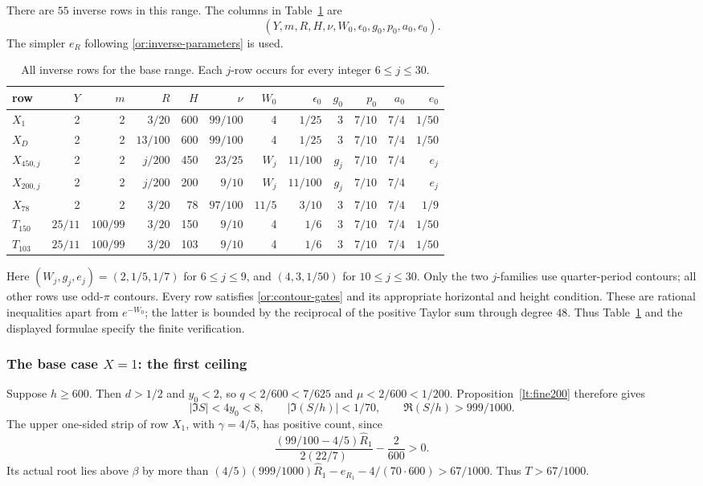 There are $55$ inverse rows in this range.  The columns in
Table~\ref{or:base-contours} are
\[
 (Y,m,R,H,\nu,W_0,\epsilon_0,g_0,p_0,a_0,e_0).
\]
The simpler $e_R$ following \eqref{or:inverse-parameters} is used.
\begin{table}[ht]
\centering\scriptsize
\caption{All inverse rows for the base range.  Each $j$-row occurs for
every integer $6\le j\le30$.}\label{or:base-contours}
\begin{tabular}{@{}lrrrrrrrrrrr@{}}
\toprule
row&$Y$&$m$&$R$&$H$&$\nu$&$W_0$&$\epsilon_0$&$g_0$&$p_0$&$a_0$&$e_0$\\
\midrule
$X_1$&2&2&$3/20$&600&$99/100$&4&$1/25$&3&$7/10$&$7/4$&$1/50$\\
$X_D$&2&2&$13/100$&600&$99/100$&4&$1/25$&3&$7/10$&$7/4$&$1/50$\\
$X_{450,j}$&2&2&$j/200$&450&$23/25$&$W_j$&$11/100$&$g_j$&$7/10$&$7/4$&$e_j$\\
$X_{200,j}$&2&2&$j/200$&200&$9/10$&$W_j$&$11/100$&$g_j$&$7/10$&$7/4$&$e_j$\\
$X_{78}$&2&2&$3/20$&78&$97/100$&$11/5$&$3/10$&3&$7/10$&$7/4$&$1/9$\\
$T_{150}$&$25/11$&$100/99$&$3/20$&150&$9/10$&4&$1/6$&3&$7/10$&$7/4$&$1/50$\\
$T_{103}$&$25/11$&$100/99$&$3/20$&103&$9/10$&4&$1/6$&3&$7/10$&$7/4$&$1/50$\\
\bottomrule
\end{tabular}
\end{table}
Here $(W_j,g_j,e_j)=(2,1/5,1/7)$ for $6\le j\le9$, and
$(4,3,1/50)$ for $10\le j\le30$.  Only the two $j$-families use
quarter-period contours; all other rows use odd-$\pi$ contours.
Every row satisfies \eqref{or:contour-gates} and its appropriate
horizontal and height condition.  These are rational inequalities
apart from $e^{-W_0}$; the latter is bounded by the reciprocal of the
positive Taylor sum through degree $48$.  Thus Table~\ref{or:base-contours}
and the displayed formulae specify the finite verification.

\subsubsection{The base case $X=1$: the first ceiling}

Suppose $h\ge600$.  Then $d>1/2$ and $y_0<2$, so
$q<2/600<7/625$ and $\mu<2/600<1/200$.
Proposition~\ref{lt:fine200} therefore gives
\begin{equation}\label{or:base-high-phase}
 |\Im S|<4y_0<8,\qquad
 |\Im(S/h)|<1/70,\qquad \Re(S/h)>999/1000.
\end{equation}
The upper one-sided strip of row $X_1$, with $\gamma=4/5$, has
positive count, since
\[
 \frac{(99/100-4/5)\widehat R_1}{2(22/7)}-\frac2{600}>0.
\]
Its actual root lies above $\beta$ by more than
$(4/5)(999/1000)\widehat R_1-e_{R_1}-4/(70\cdot600)>67/1000$.
Thus $T>67/1000$.


